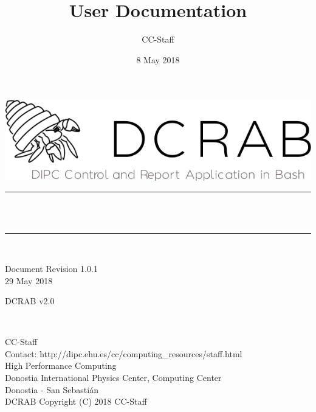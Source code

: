 \documentclass[10pt,a4paper]{report}
\author{CC-Staff}
\title{User Documentation}
\date{8 May 2018}
\makeatletter
\let\thetitle\@title
\makeatother
\begin{document}

\begin{titlepage}
	\centering
    \vspace*{3 cm}
    \includegraphics[scale = 0.6]{../auxFiles/logos/DCRAB_logo.png}\\[1.0 cm]
		\vspace*{2 cm}
	\rule{\linewidth}{0.2 mm} \\[0.4 cm]
	{ \huge \bfseries \thetitle}\\
	\rule{\linewidth}{0.2 mm} \\[0.4 cm]
\vspace*{4.5 cm}
	\begin{minipage}{0.4\textwidth}
		\begin{flushleft} \large
			Document Revision 1.0.1\\
			29 May 2018\\
			\end{flushleft}
			\end{minipage}
			\begin{minipage}{0.4 \textwidth}
			\begin{flushright} \large
			DCRAB v2.0\\
		\end{flushright}
	\end{minipage}\\[2 cm]

\newpage
\thispagestyle{empty}
\begin{flushleft}
CC-Staff \\
Contact: http://dipc.ehu.es/cc/computing\_resources/staff.html \\
High Performance Computing \\
Donostia International Physics Center, Computing Center \\
Donostia - San Sebasti\'an \\
\vspace{1cm}
DCRAB Copyright (C) 2018 CC-Staff
\end{flushleft}

\newpage
\end{titlepage}
\end{document}
